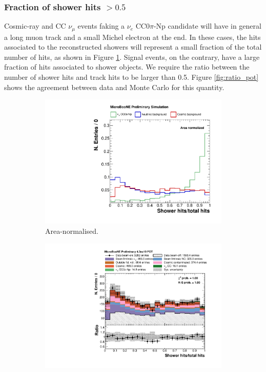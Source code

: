 \subsubsection*{Fraction of shower hits $> 0.5$}
Cosmic-ray and CC $\nu_{\mu}$ events faking a $\nu_{e}$ CC0$\pi$-Np candidate will have in general a long muon track and a small Michel electron at the end. In these cases, the hits associated to the reconstructed showers will represent a small fraction of the total number of hits, as shown in Figure \ref{fig:ratio_norm}. Signal events, on the contrary, have a large fraction of hits associated to shower objects. We require the ratio between the number of shower hits and track hits to be larger than 0.5. Figure \ref{fig:ratio_pot} shows the agreement between data and Monte Carlo for this quantity.

\begin{figure}[htbp]
\centering
  \begin{subfigure}{0.49\textwidth}
    \includegraphics[width=\linewidth]{figures/h_hits_ratio_norm.pdf}
    \caption{Area-normalised.} \label{fig:ratio_norm}
  \end{subfigure}
    \begin{subfigure}{0.49\textwidth}
    \includegraphics[width=\linewidth]{figures/h_hits_ratio.pdf}

\end{subfigure}
\end{figure}
